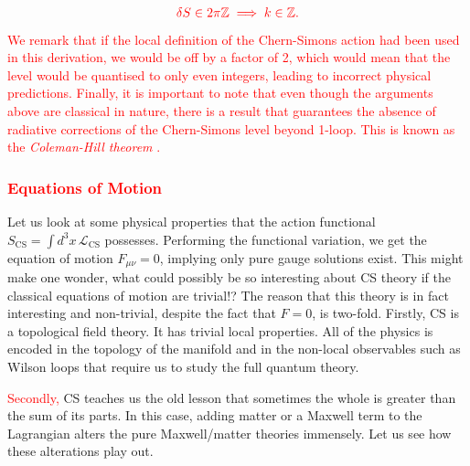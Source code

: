 \begin{align}
    \textcolor{red}{\delta S \in 2\pi \mathbb{Z} \implies k\in \mathbb{Z}.}
\end{align}
\textcolor{red}{We remark that if the local definition of the Chern-Simons action had been used in this derivation, we would be off by a factor of 2, which would mean that the level would be quanti\textcolor{red}{s}ed to only even integers, leading to incorrect physical predictions. Finally, it is important to note that even though the arguments above are classical in nature, there is a result that guarantees the absence of radiative corrections of the Chern-Simons level beyond 1-loop. This is known as the \textit{Coleman-Hill theorem} \cite{Coleman:1985zi, Khare:1994yv}.  }
 \textcolor{red}{\subsubsection*{Equations of Motion}}
    Let us look at some physical properties that the action functional $S_{\text{CS}} = \int d^3x \, \mathcal{L}_{\text{CS}}$ possesses. Performing the functional variation, we get the equation of motion $F_{\mu \nu}=0$, implying only pure gauge solutions exist. This might make one wonder, what could possibly be so interesting about CS theory if the classical equations of motion are trivial!?
    The reason that this theory is in fact interesting and non-trivial, despite the fact that $F=0$, is two-fold. Firstly, CS is a topological field theory. It has trivial local properties. All of the physics is encoded in the topology of the manifold and in the non-local observables such as Wilson loops that require us to study the full quantum theory.

    \textcolor{red}{Secondly,} CS teaches us the old lesson that sometimes the whole is greater than the sum of its parts. In this case, adding matter or a Maxwell term to the Lagrangian alters the pure Maxwell/matter theories immensely. Let us see how these alterations play out.

